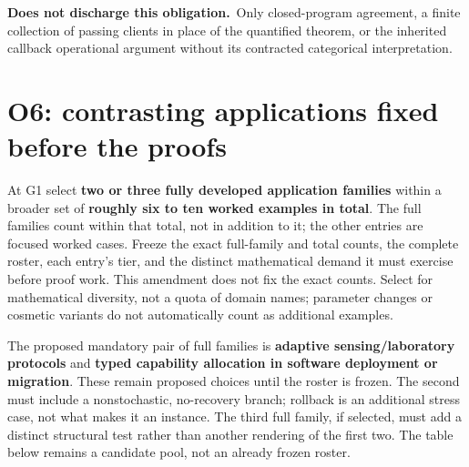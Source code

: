 \documentclass[11pt,a4paper]{article}
\newcommand{\notaccepted}{\par\textbf{Does not discharge this obligation.}\ }
\begin{document}
\notaccepted Only closed-program agreement, a finite collection of passing
clients in place of the quantified theorem, or the inherited callback
operational argument without its contracted categorical interpretation.

\section{O6: contrasting applications fixed before the proofs}\label{sec:o6}

At G1 select \textbf{two or three fully developed application families}
within a broader set of \textbf{roughly six to ten worked examples in total}.
The full families count within that total, not in addition to it; the other
entries are focused worked cases. Freeze the exact full-family and total
counts, the complete roster, each entry's tier, and the distinct mathematical
demand it must exercise before proof work. This amendment does not fix the
exact counts. Select for mathematical diversity, not a quota of domain
names; parameter changes or cosmetic variants do not automatically count as
additional examples.

The proposed mandatory pair of full families is
\textbf{adaptive sensing/laboratory protocols} and \textbf{typed capability
allocation in software deployment or migration}. These remain proposed
choices until the roster is frozen. The second must include a nonstochastic,
no-recovery branch; rollback is an additional stress case, not what makes
it an instance. The third full family, if selected, must add a distinct
structural test rather than another rendering of the first two. The table
below remains a candidate pool, not an already frozen roster.
\end{document}
